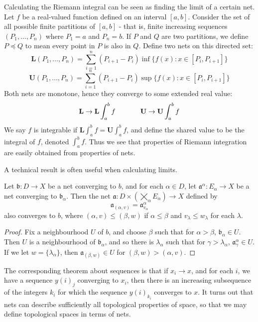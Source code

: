 \begin{example}
\begin{example}
    Calculating the Riemann integral can be seen as finding the limit of a certain net. Let $f$ be a real-valued function defined on an interval $[a,b]$. Consider the set of all possible finite partitions of $[a,b]$ - that is, finite increasing sequences $(P_1, \dots, P_n)$ where $P_1 = a$ and $P_n = b$. If $P$ and $Q$ are two partitions, we define $P \preceq Q$ to mean every point in $P$ is also in $Q$. Define two nets on this directed set:
    \[ \mathbf{L}(P_1, \dots, P_n) = \sum_{i = 1}^n (P_{i+1} - P_i) \inf \{ f(x) : x \in [P_i, P_{i+1}] \} \]
    \[ \mathbf{U}(P_1, \dots, P_n) = \sum_{i = 1}^n (P_{i+1} - P_i) \sup \{ f(x) : x \in [P_i, P_{i+1}] \} \]
    Both nets are monotone, hence they converge to some extended real value:
    \[ \mathbf{L} \to \mathbf{L} \int_a^b f \hspace{0.5in} \mathbf{U} \to \mathbf{U} \int_a^b f \]
    We say $f$ is integrable if $\mathbf{L} \int_a^b f = \mathbf{U} \int_a^b f$, and define the shared value to be the integral of $f$, denoted $\int_a^b f$. Thus we see that properties of Riemann integration are easily obtained from properties of nets.
\end{example}

A technical result is often useful when calculating limits.

\begin{theorem}
    Let $\mathfrak{b}: D \to X$ be a net converging to $b$, and for each $\alpha \in D$, let $\mathfrak{a}^\alpha: E_\alpha \to X$ be a net converging to $\mathfrak{b}_\alpha$. Then the net $\mathfrak{a}: D \times (\bigtimes_\alpha E_\alpha) \to X$ defined by
    \[ \mathfrak{a}_{(\alpha, v)} = \mathfrak{a}^\alpha_{v_\alpha} \]
    also converges to $b$, where $(\alpha, v) \leq (\beta, w)$ if $\alpha \leq \beta$ and $v_\lambda \leq w_\lambda$ for each $\lambda$.
\end{theorem}
\begin{proof}
    Fix a neighbourhood $U$ of $b$, and choose $\beta$ such that for $\alpha > \beta$, $\mathfrak{b}_\alpha \in U$. Then $U$ is a neighbourhood of $\mathfrak{b}_\alpha$, and so there is $\lambda_\alpha$ such that for $\gamma > \lambda_\alpha$, $\mathfrak{a}^\alpha_\gamma \in U$. If we let $w = \{ \lambda_\alpha \}$, then $\mathfrak{a}_{(\beta, w)} \in U$ for $(\beta, w) > (\alpha, v)$.
\end{proof}

The corresponding theorem about sequences is that if $x_i \to x$, and for each $i$, we have a sequence $y(i)_j$ converging to $x_i$, then there is an increasing subsequence of the integers $k_i$ for which the sequence $y(i)_{k_i}$ converges to $x$. It turns out that nets can describe sufficiently all topological properties of space, so that we may define topological spaces in terms of nets.


\end{example}
